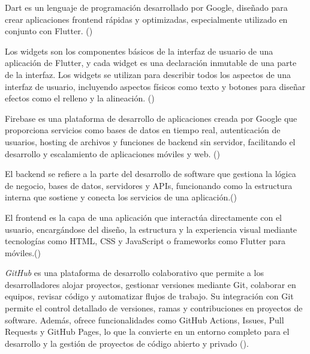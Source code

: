 \begin{definition}[Dart]

Dart es un lenguaje de programación desarrollado por Google, diseñado para crear aplicaciones frontend rápidas y optimizadas, especialmente utilizado en conjunto con Flutter. (\cite{dart})
\end{definition}

\begin{definition}[Widget]

Los widgets son los componentes básicos de la interfaz de usuario de una aplicación de Flutter, y cada widget es una declaración inmutable de una parte de la interfaz. Los widgets se utilizan para describir todos los aspectos de una interfaz de usuario, incluyendo aspectos físicos como texto y botones para diseñar efectos como el relleno y la alineación. (\cite{flutter_multiplataforma})
\end{definition}



\begin{definition}[Firebase]

Firebase es una plataforma de desarrollo de aplicaciones creada por Google que proporciona servicios como bases de datos en tiempo real, autenticación de usuarios, hosting de archivos y funciones de backend sin servidor, facilitando el desarrollo y escalamiento de aplicaciones móviles y web. (\cite{firebase})
\end{definition}


\begin{definition}[Backend]
El backend se refiere a la parte del desarrollo de software que gestiona la lógica de negocio, bases de datos, servidores y APIs, funcionando como la estructura interna que sostiene y conecta los servicios de una aplicación.(\cite{backend})
\end{definition}



\begin{definition}[Frontend]
  El frontend es la capa de una aplicación que interactúa directamente con el usuario, encargándose del diseño, la estructura y la experiencia visual mediante tecnologías como HTML, CSS y JavaScript o frameworks como Flutter para móviles.(\cite{frontend})
\end{definition}


\begin{definition}[GitHub]
  \textit{GitHub} es una plataforma de desarrollo colaborativo que permite a los desarrolladores alojar proyectos, gestionar versiones mediante Git, colaborar en equipos, revisar código y automatizar flujos de trabajo. Su integración con Git permite el control detallado de versiones, ramas y contribuciones en proyectos de software. Además, ofrece funcionalidades como GitHub Actions, Issues, Pull Requests y GitHub Pages, lo que la convierte en un entorno completo para el desarrollo y la gestión de proyectos de código abierto y privado  (\cite{githubdocs}).
\end{definition}


